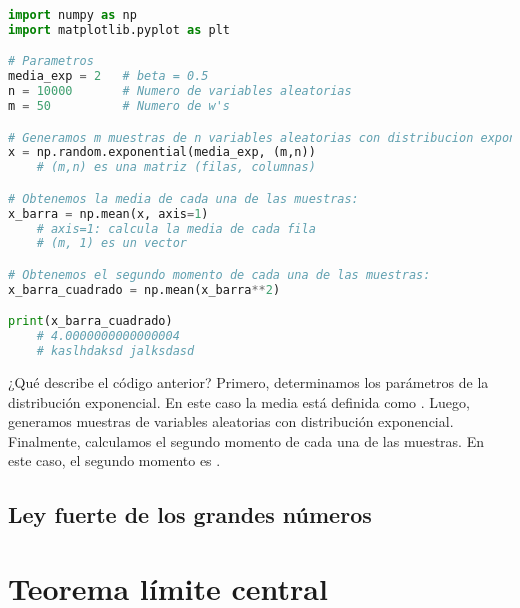 \documentclass[8pt]{article}
\newcommand{\code}[1]{\texttt{\color{frenchplum}{#1}}}
\begin{document}
\vspace*{0.3cm}

\begin{lstlisting}[language=Python]
import numpy as np
import matplotlib.pyplot as plt

# Parametros
media_exp = 2   # beta = 0.5
n = 10000       # Numero de variables aleatorias
m = 50          # Numero de w's

# Generamos m muestras de n variables aleatorias con distribucion exponencial:
x = np.random.exponential(media_exp, (m,n))
    # (m,n) es una matriz (filas, columnas)

# Obtenemos la media de cada una de las muestras:
x_barra = np.mean(x, axis=1)
    # axis=1: calcula la media de cada fila
    # (m, 1) es un vector

# Obtenemos el segundo momento de cada una de las muestras:
x_barra_cuadrado = np.mean(x_barra**2)

print(x_barra_cuadrado)
    # 4.0000000000000004
    # kaslhdaksd jalksdasd
\end{lstlisting}

\vspace*{0.3cm}

¿Qué describe el código anterior? Primero, determinamos los parámetros de la distribución exponencial. En este caso la media está definida como \code{media\_exp = 2}. Luego, generamos \code{m} muestras de \code{n} variables aleatorias con distribución exponencial. Finalmente, calculamos el segundo momento de cada una de las muestras. En este caso, el segundo momento es \code{4.0000000000000004}.





\subsection{Ley fuerte de los grandes números}




\section{Teorema límite central}
\end{document}

